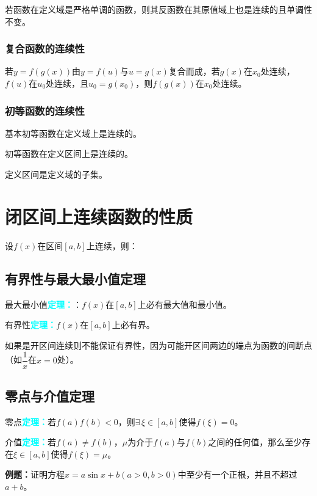 \documentclass[UTF8, 12pt]{ctexart}
\begin{document}
        若函数在定义域是严格单调的函数，则其反函数在其原值域上也是连续的且单调性不变。

        \subsubsection{复合函数的连续性}

        若$y=f(g(x))$由$y=f(u)$与$u=g(x)$复合而成，若$g(x)$在$x_0$处连续，$f(u)$在$u_0$处连续，且$u_0=g(x_0)$，则$f(g(x))$在$x_0$处连续。

        \subsubsection{初等函数的连续性}

        基本初等函数在定义域上是连续的。

        初等函数在定义区间上是连续的。

        定义区间是定义域的子集。

        \section{闭区间上连续函数的性质}

        设$f(x)$在区间$[a,b]$上连续，则：

        \subsection{有界性与最大最小值定理}

        最大最小值\textcolor{aqua}{\textbf{定理：}}：$f(x)$在$[a,b]$上必有最大值和最小值。

        有界性\textcolor{aqua}{\textbf{定理：}}$f(x)$在$[a,b]$上必有界。

        如果是开区间连续则不能保证有界性，因为可能开区间两边的端点为函数的间断点（如$\dfrac{1}{x}$在$x=0$处）。

        \subsection{零点与介值定理}

        零点\textcolor{aqua}{\textbf{定理：}}若$f(a)f(b)<0$，则$\exists\,\xi\in[a,b]$使得$f(\xi)=0$。

        介值\textcolor{aqua}{\textbf{定理：}}若$f(a)\neq f(b)$，$\mu$为介于$f(a)$与$f(b)$之间的任何值，那么至少存在$\xi\in[a,b]$使得$f(\xi)=\mu$。

        \textbf{例题：}证明方程$x=a\sin x+b(a>0,b>0)$中至少有一个正根，并且不超过$a+b$。
\end{document}
